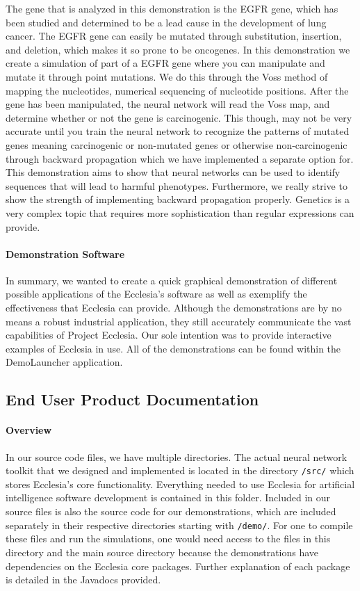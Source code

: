\documentclass[letterpaper, 10pt]{article}
\begin{document}
		The gene that is analyzed in this demonstration is the EGFR gene, which has been studied and determined to be a lead cause in the development of lung cancer. The EGFR gene can easily be mutated through substitution, insertion, and deletion, which makes it so prone to be oncogenes. In this demonstration we create a simulation of part of a EGFR gene where you can manipulate and mutate it through point mutations. We do this through the Voss method of mapping the nucleotides, numerical sequencing of nucleotide positions. After the gene has been manipulated, the neural network will read the Voss map, and determine whether or not the gene is carcinogenic. This though, may not be very accurate until you train the neural network to recognize the patterns of mutated genes meaning carcinogenic or non-mutated genes or otherwise non-carcinogenic through backward propagation which we have implemented a separate option for.
		This demonstration aims to show that neural networks can be used to identify sequences that will lead to harmful phenotypes. Furthermore, we really strive to show the strength of implementing backward propagation properly. Genetics is a very complex topic that requires more sophistication than regular expressions can provide.
		



		
		\paragraph{Demonstration Software} In summary, we wanted to create a quick graphical demonstration of different possible applications of the Ecclesia's software as well as exemplify the effectiveness that Ecclesia can provide. Although the demonstrations are by no means a robust industrial application, they still accurately communicate the vast capabilities of Project Ecclesia. Our sole intention was to provide interactive examples of Ecclesia in use. All of the demonstrations can be found within the DemoLauncher application.
	
	\clearpage
	\subsection{End User Product Documentation}
		\paragraph{Overview}
		In our source code files, we have multiple directories. The actual neural network toolkit that we designed and implemented is located in the directory \texttt{/src/} which stores Ecclesia's core functionality. Everything needed to use Ecclesia for artificial intelligence software development is contained in this folder. Included in our source files is also the source code for our demonstrations, which are included separately in their respective directories starting with \texttt{/demo/}. For one to compile these files and run the simulations, one would need access to the files in this directory and the main source directory because the demonstrations have dependencies on the Ecclesia core packages. Further explanation of each package is detailed in the Javadocs provided.
		
\end{document}
